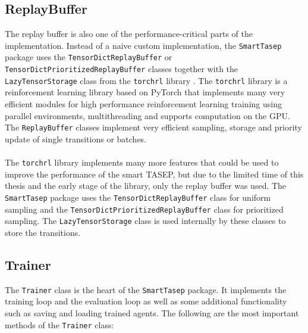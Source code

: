 \subsection{ReplayBuffer}
\label{subsec:implementation-replaybuffer}
The replay buffer is also one of the performance-critical parts of the implementation. Instead of a naive custom implementation, the \texttt{SmartTasep} package uses the \texttt{TensorDictReplayBuffer} or \texttt{TensorDictPrioritizedReplayBuffer} classes together with the \texttt{LazyTensorStorage} class from the \texttt{torchrl} library \cite{bou_torchrl_2023}. The \texttt{torchrl} library is a reinforcement learning library based on PyTorch that implements many very efficient modules for high performance reinforcement learning training using parallel environments, multithreading and supports computation on the GPU. The \texttt{ReplayBuffer} classes implement very efficient sampling, storage and priority update of single transitions or batches. 
\\
\\
The \texttt{torchrl} library implements many more features that could be used to improve the performance of the smart TASEP, but due to the limited time of this thesis and the early stage of the library, only the replay buffer was used. The \texttt{SmartTasep} package uses the \texttt{TensorDictReplayBuffer} class for uniform sampling and the \texttt{TensorDictPrioritized\-ReplayBuffer} class for prioritized sampling. The \texttt{LazyTensorStorage} class is used internally by these classes to store the transitions. 



\subsection{Trainer}
\label{subsec:implementation-trainer}
The \texttt{Trainer} class is the heart of the \texttt{SmartTasep} package. It implements the training loop and the evaluation loop as well as some additional functionality such as saving and loading trained agents. The following are the most important methods of the \texttt{Trainer} class:

